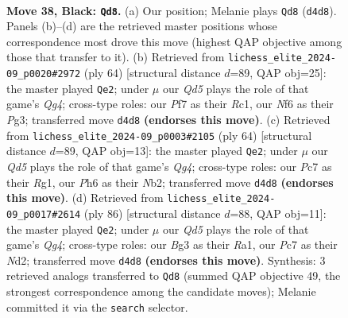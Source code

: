 \documentclass[11pt]{article}
\begin{document}
\begin{figure}[p]
\label{fig:thought-m73}
\end{figure}

\clearpage

\begin{figure}[p]\centering
\begin{subfigure}{0.46\textwidth}\centering
\resizebox{\linewidth}{!}{%
\newchessgame
\chessboard[
  setfen={r1b4k/ppp2pp1/5n1p/8/3q4/4QPbP/PPB3P1/R1B3K1 b - - 17 38},
  showmover=false,
  pgfstyle=straightmove, color=movearrow, markmove={d4-d8}
]}
\caption{}
\end{subfigure}\hfill
\begin{subfigure}{0.46\textwidth}\centering
\resizebox{\linewidth}{!}{%
\newchessgame
\chessboard[
  setfen={3r2k1/1p1q2pp/2b2p2/4p3/p3P1Q1/2B3PP/5P2/2R3K1 w - - 1 33},
  showmover=false,
  pgfstyle=straightmove, color=movearrow, markmove={g4-e2}
]}
\caption{}
\end{subfigure}
\\[4pt]
\begin{subfigure}{0.46\textwidth}\centering
\resizebox{\linewidth}{!}{%
\newchessgame
\chessboard[
  setfen={6k1/2pbq1b1/1p3r1p/p3p3/P5QP/1PP1B3/KN3P2/6R1 w - - 1 33},
  showmover=false,
  pgfstyle=straightmove, color=movearrow, markmove={g4-e2}
]}
\caption{}
\end{subfigure}\hfill
\begin{subfigure}{0.46\textwidth}\centering
\resizebox{\linewidth}{!}{%
\newchessgame
\chessboard[
  setfen={r4b1k/2qb2p1/5p1p/p3p3/P1P3Q1/2B1P2P/3N1PP1/R5K1 w - - 15 44},
  showmover=false,
  pgfstyle=straightmove, color=movearrow, markmove={g4-e2}
]}
\caption{}
\end{subfigure}
\caption{\textbf{Move 38, Black: \texttt{Qd8}.} (a) Our position; Melanie plays \texttt{Qd8} (\texttt{d4d8}). Panels (b)--(d) are the retrieved master positions whose correspondence most drove this move (highest QAP objective among those that transfer to it). (b) Retrieved from \texttt{lichess\_elite\_2024-09\_p0020\#2972} (ply 64) [structural distance $d$=89, QAP obj=25]: the master played \texttt{Qe2}; under $\mu$ our \emph{Qd5} plays the role of that game's \emph{Qg4}; cross-type roles: our \emph{P}f7 as their \emph{R}c1, our \emph{N}f6 as their \emph{P}g3; transferred move \texttt{d4d8} \textbf{(endorses this move)}. (c) Retrieved from \texttt{lichess\_elite\_2024-09\_p0003\#2105} (ply 64) [structural distance $d$=89, QAP obj=13]: the master played \texttt{Qe2}; under $\mu$ our \emph{Qd5} plays the role of that game's \emph{Qg4}; cross-type roles: our \emph{P}c7 as their \emph{R}g1, our \emph{P}h6 as their \emph{N}b2; transferred move \texttt{d4d8} \textbf{(endorses this move)}. (d) Retrieved from \texttt{lichess\_elite\_2024-09\_p0017\#2614} (ply 86) [structural distance $d$=88, QAP obj=11]: the master played \texttt{Qe2}; under $\mu$ our \emph{Qd5} plays the role of that game's \emph{Qg4}; cross-type roles: our \emph{B}g3 as their \emph{R}a1, our \emph{P}c7 as their \emph{N}d2; transferred move \texttt{d4d8} \textbf{(endorses this move)}. Synthesis: 3 retrieved analogs transferred to \texttt{Qd8} (summed QAP objective 49, the strongest correspondence among the candidate moves); Melanie committed it via the \texttt{search} selector.}

\end{figure}
\end{document}
